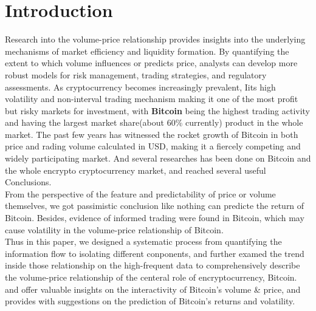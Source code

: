 \documentclass{elsarticle}
\begin{document}
\section{Introduction}
Research into the volume-price relationship provides insights into the underlying mechanisms of market efficiency and liquidity formation. By quantifying the extent to which volume influences or predicts price, analysts can develop more robust models for risk management, trading strategies, and regulatory assessments. As cryptocurrency becomes increasingly prevalent, Iits high volatility and non-interval trading mechanism making it one of the most profit but risky markets  for investment, with \textbf{Bitcoin} being the highest trading activity and having the largest market share(about 60\% currently) product in the whole market. The past few years has witnessed the rocket growth of Bitcoin in both price and rading volume calculated in USD, making it a fiercely competing and widely participating market. And several researches has been done on Bitcoin and the whole encrypto cryptocurrency market, and reached several useful Conclusions.\\
From the perspective of the feature and predictability of price or volume themselves, we got passimistic conclusion like nothing can predicte the return of Bitcoin\cite{aalborg2019can}. Besides, evidence of informed trading were found in Bitcoin\cite{feng2018informed}, which may cause volatility in the volume-price relationship of Bitcoin.\\
Thus in this paper, we designed a systematic process from quantifying the information flow to isolating different conponents, and further examed the trend inside those relationship on the high-frequent data to comprehensively describe the volume-price relationship of the centeral role of encryptocurrency, Bitcoin. and offer valuable insights on the interactivity of Bitcoin's volume \& price, and provides with suggestions on the prediction  of Bitcoin's returns and volatility.
\end{document}
